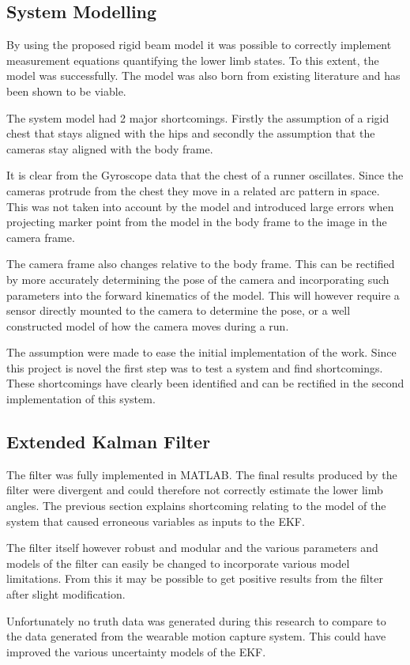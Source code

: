 \subsection{System Modelling}
By using the proposed rigid beam model it was possible to correctly implement measurement equations quantifying the lower limb states. To this extent, the model was successfully. The model was also born from existing literature and has been shown to be viable.

The system model had 2 major shortcomings. Firstly the assumption of a rigid chest that stays aligned with the hips and secondly the assumption that the cameras stay aligned with the body frame.

It is clear from the Gyroscope data that the chest of a runner oscillates. Since the cameras protrude from the chest they move in a related arc pattern in space. This was not taken into account by the model and introduced large errors when projecting marker point from the model in the body frame to the image in the camera frame.

The camera frame also changes relative to the body frame. This can be rectified by more accurately determining the pose of the camera and incorporating such parameters into the forward kinematics of the model. This will however require a sensor directly mounted to the camera to determine the pose, or a well constructed model of how the camera moves during a run.

The assumption were made to ease the initial implementation of the work. Since this project is novel the first step was to test a system and find shortcomings. These shortcomings have clearly been identified and can be rectified in the second implementation of this system.

\subsection{Extended Kalman Filter}
The filter was fully implemented in MATLAB. The final results produced by the filter were divergent and could therefore not correctly estimate the lower limb angles. The previous section explains shortcoming relating to the model of the system that caused erroneous variables as inputs to the EKF.

The filter itself however robust and modular and the various parameters and models of the filter can easily be changed to incorporate various model limitations. From this it may be possible to get positive results from the filter after slight modification.

Unfortunately no truth data was generated during this research to compare to the data generated from the wearable motion capture system. This could have improved the various uncertainty models of the EKF.




 











